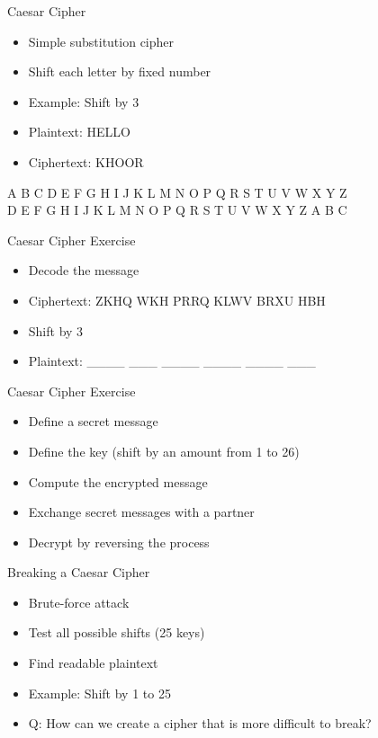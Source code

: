 \begin{withoutheadline}
\begin{frame}{Caesar Cipher}
\begin{itemize}
    \item Simple substitution cipher
    \item Shift each letter by fixed number
    \item Example: Shift by 3
    \item Plaintext: HELLO
    \item Ciphertext: KHOOR
\end{itemize}

A B C D E F G H I J K L M N O P Q R S T U V W X Y Z \\
D E F G H I J K L M N O P Q R S T U V W X Y Z A B C \\

\end{frame}

\begin{frame}{Caesar Cipher Exercise}
\begin{itemize}
    \item Decode the message
    \item Ciphertext: ZKHQ WKH PRRQ KLWV BRXU HBH
    \item Shift by 3
    \item Plaintext:  \_\_\_\_ \_\_\_ \_\_\_\_ \_\_\_\_ \_\_\_\_ \_\_\_
\end{itemize}
\end{frame}

\begin{frame}{Caesar Cipher Exercise}
\begin{itemize}
    \item Define a secret message
    \item Define the key (shift by an amount from 1 to 26)
    \item Compute the encrypted message
    \item Exchange secret messages with a partner
    \item Decrypt by reversing the process
\end{itemize}
\end{frame}

\begin{frame}{Breaking a Caesar Cipher}
\begin{itemize}
    \item Brute-force attack
    \item Test all possible shifts (25 keys)
    \item Find readable plaintext
    \item Example: Shift by 1 to 25
    \item Q: How can we create a cipher that is more difficult to break?
\end{itemize}
\end{frame}


\end{withoutheadline}
